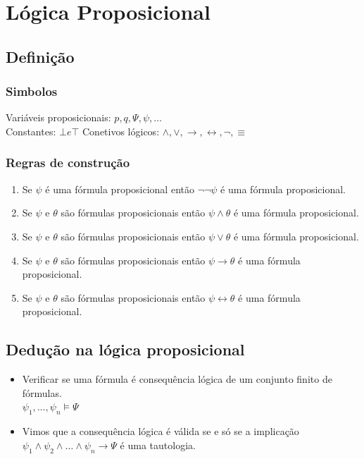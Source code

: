 \documentclass[11pt]{report}
\begin{document}
    \chapter*{Lógica Proposicional}
    \section*{Definição}
    \subsection*{Simbolos}
    Variáveis proposicionais: $p, q, \Psi, \psi, \ldots$\\
    Constantes: $\bot e \top$
    Conetivos lógicos: $\wedge, \vee, \rightarrow, \leftrightarrow, \neg, \equiv$
    \subsection*{Regras de construção}
    \begin{enumerate}
        \item{Se $\psi$ é uma fórmula proposicional então $\neg\neg\psi$ é uma fórmula proposicional.}
        \item{Se $\psi$ e $\theta$ são fórmulas proposicionais então $\psi\wedge\theta$ é uma fórmula proposicional.}
        \item{Se $\psi$ e $\theta$ são fórmulas proposicionais então $\psi\vee\theta$ é uma fórmula proposicional.}
        \item{Se $\psi$ e $\theta$ são fórmulas proposicionais então $\psi\rightarrow\theta$ é uma fórmula proposicional.}
        \item{Se $\psi$ e $\theta$ são fórmulas proposicionais então $\psi\leftrightarrow\theta$ é uma fórmula proposicional.}
    \end{enumerate}

    \section*{Dedução na lógica proposicional}
    \begin{itemize}
        \item {Verificar se uma fórmula é consequência lógica de um conjunto finito de fórmulas.\\
            $\psi_1, \ldots, \psi_n \models \Psi$
        }
        \item {Vimos que a consequência lógica é válida se e só se a implicação\\
            $\psi_1 \wedge \psi_2 \wedge \ldots \wedge \psi_n \rightarrow \Psi$ é uma tautologia.
        }
    \end{itemize}
\end{document}
